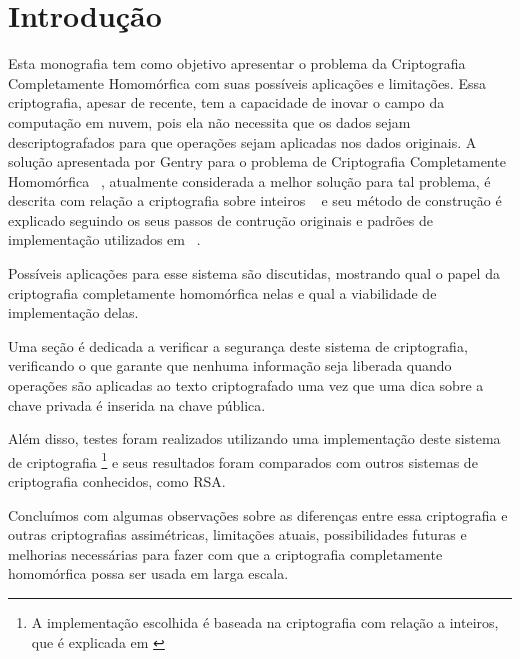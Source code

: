 \chapter{Introdução}
\label{introducao}
Esta monografia tem como objetivo apresentar o problema da Criptografia Completamente Homomórfica com suas possíveis aplicações e limitações.
Essa criptografia, apesar de recente, tem a capacidade de inovar o campo da computação em nuvem, pois ela não necessita que os dados sejam descriptografados para que operações sejam aplicadas nos dados originais.
A solução apresentada por Gentry para o problema de Criptografia Completamente Homomórfica ~\cite{gentrythesis}, atualmente considerada a melhor solução para tal problema, é descrita com relação a criptografia sobre inteiros ~\cite{fheintegers} e seu método de construção é explicado seguindo os seus passos de contrução originais e padrões de implementação utilizados em ~\cite{gentryhalevi}.

Possíveis aplicações para esse sistema são discutidas, mostrando qual o papel da criptografia completamente homomórfica nelas e qual a viabilidade de implementação delas.

Uma seção é dedicada a verificar a segurança deste sistema de criptografia, verificando o que garante que nenhuma informação seja liberada quando operações são aplicadas ao texto criptografado uma vez que uma dica sobre a chave privada é inserida na chave pública.

Além disso, testes foram realizados utilizando uma implementação deste sistema de criptografia \footnote{A implementação escolhida é baseada na criptografia com relação a inteiros, que é explicada em \cite{art:REF_ART_1}} e seus resultados foram comparados com outros sistemas de criptografia conhecidos, como RSA.

Concluímos com algumas observações sobre as diferenças entre essa criptografia e outras criptografias assimétricas, limitações atuais, possibilidades futuras e melhorias necessárias para fazer com que a criptografia completamente homomórfica possa ser usada em larga escala.